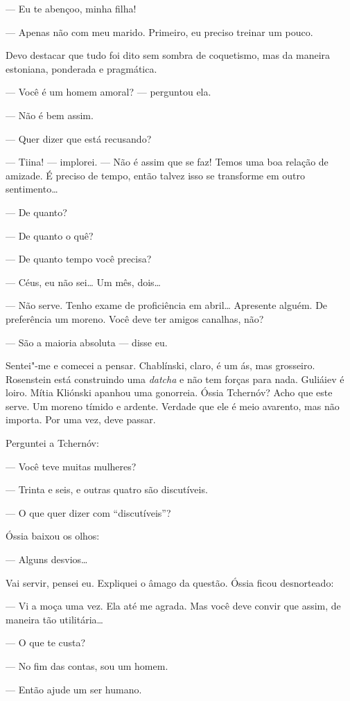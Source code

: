 --- Eu te abençoo, minha filha!

--- Apenas não com meu marido. Primeiro, eu preciso treinar um pouco.

Devo destacar que tudo foi dito sem sombra de coquetismo, mas da maneira
estoniana, ponderada e pragmática.

--- Você é um homem amoral? --- perguntou ela.

--- Não é bem assim.

--- Quer dizer que está recusando?

--- Tiina! --- implorei. --- Não é assim que se faz! Temos uma boa
relação de amizade. É preciso de tempo, então talvez isso se transforme
em outro sentimento\ldots{}

--- De quanto?

--- De quanto o quê?

--- De quanto tempo você precisa?

--- Céus, eu não sei\ldots{} Um mês, dois\ldots{}

--- Não serve. Tenho exame de proficiência em abril\ldots{} Apresente alguém.
De preferência um moreno. Você deve ter amigos canalhas, não?

--- São a maioria absoluta --- disse eu.

Sentei"-me e comecei a pensar. Chablínski, claro, é um ás, mas grosseiro.
Rosenstein está construindo uma \emph{datcha} e não tem forças para
nada. Guliáiev é loiro. Mítia Kliónski apanhou uma gonorreia. Óssia
Tchernóv? Acho que este serve. Um moreno tímido e ardente. Verdade que
ele é meio avarento, mas não importa. Por uma vez, deve passar.

Perguntei a Tchernóv:

--- Você teve muitas mulheres?

--- Trinta e seis, e outras quatro são discutíveis.

--- O que quer dizer com ``discutíveis''?

Óssia baixou os olhos:

--- Alguns desvios\ldots{}

Vai servir, pensei eu. Expliquei o âmago da questão. Óssia ficou
desnorteado:

--- Vi a moça uma vez. Ela até me agrada. Mas você deve convir que
assim, de maneira tão utilitária\ldots{}

--- O que te custa?

--- No fim das contas, sou um homem.

--- Então ajude um ser humano.

